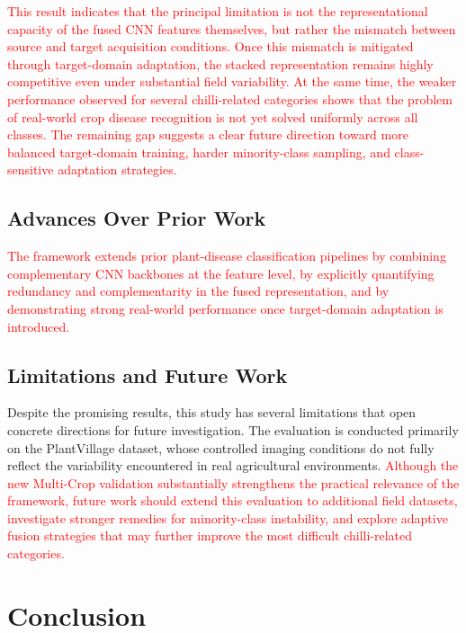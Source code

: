 \documentclass[pdflatex,sn-basic]{sn-jnl}
\begin{document}
\textcolor{red}{This result indicates that the principal limitation is not the representational capacity of the fused CNN features themselves, but rather the mismatch between source and target acquisition conditions. Once this mismatch is mitigated through target-domain adaptation, the stacked representation remains highly competitive even under substantial field variability. At the same time, the weaker performance observed for several chilli-related categories shows that the problem of real-world crop disease recognition is not yet solved uniformly across all classes. The remaining gap suggests a clear future direction toward more balanced target-domain training, harder minority-class sampling, and class-sensitive adaptation strategies.}

\subsection{Advances Over Prior Work}

\textcolor{red}{The framework extends prior plant-disease classification pipelines by combining complementary CNN backbones at the feature level, by explicitly quantifying redundancy and complementarity in the fused representation, and by demonstrating strong real-world performance once target-domain adaptation is introduced.}

\subsection{Limitations and Future Work}

Despite the promising results, this study has several limitations that open concrete directions for future investigation. The evaluation is conducted primarily on the PlantVillage dataset, whose controlled imaging conditions do not fully reflect the variability encountered in real agricultural environments. \textcolor{red}{Although the new Multi-Crop validation substantially strengthens the practical relevance of the framework, future work should extend this evaluation to additional field datasets, investigate stronger remedies for minority-class instability, and explore adaptive fusion strategies that may further improve the most difficult chilli-related categories.}

\section{Conclusion}
\label{sec:conclusion}
\end{document}

